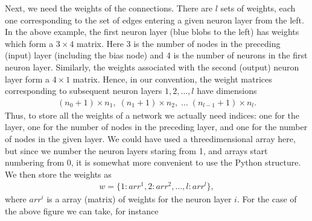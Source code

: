 \documentclass[a4paper,12pt,polish]{jupyterBook}
\begin{document}
\sphinxAtStartPar
Next, we need the weights of the connections. There are \(l\) sets of weights, each one corresponding to the set of edges entering a given neuron layer from the left.
In the above example, the first neuron layer (blue blobs to the left) has weights which form a \(3 \times 4\) matrix. Here 3 is the number of nodes in the preceding (input) layer (including the bias node) and 4 is the number of neurons in the first neuron layer. Similarly, the weights associated with the second (output) neuron layer form a \(4 \times 1\) matrix. Hence, in our convention, the weight matrices corresponding to subsequent neuron layers \(1, 2, \dots, l\) have dimensions
\begin{equation*}
\begin{split}
(n_0+1)\times n_1, \; (n_1+1)\times n_2, \; \dots \; (n_{l-1}+1)\times n_l.
\end{split}
\end{equation*}
\sphinxAtStartPar
Thus, to store all the weights of a network we actually need  indices: one for the layer, one for the number of nodes in the preceding layer, and one for the number of nodes in the given layer. We could have used a three\sphinxhyphen{}dimensional array here, but since we number the neuron layers staring from 1, and arrays start numbering from 0, it is somewhat more convenient to use the Python  structure. We then store the weights as
\begin{equation*}
\begin{split}w=\{1: arr^1, 2: arr^2, ..., l: arr^l\},\end{split}
\end{equation*}
\sphinxAtStartPar
where \(arr^i\) is a  array (matrix) of weights for the neuron layer \(i\). For the case of the above figure we can take, for instance
\end{document}
